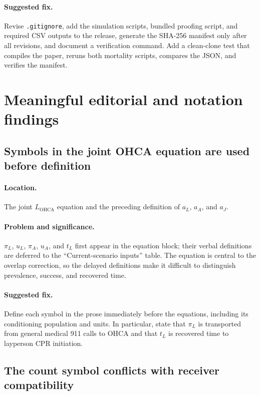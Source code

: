 \documentclass[11pt]{article}
\begin{document}
\paragraph{Suggested fix.}
Revise \texttt{.gitignore}, add the simulation scripts, bundled proofing script,
and required CSV outputs to the release, generate the SHA-256 manifest only
after all revisions, and document a verification command.  Add a clean-clone
test that compiles the paper, reruns both mortality scripts, compares the JSON,
and verifies the manifest.

\section*{Meaningful editorial and notation findings}

\subsection*{Symbols in the joint OHCA equation are used before definition}

\paragraph{Location.}
The joint $L_{\mathrm{OHCA}}$ equation and the preceding definition of $a_L$,
$a_A$, and $a_J$.

\paragraph{Problem and significance.}
$\pi_L$, $u_L$, $\pi_A$, $u_A$, and $t_L$ first appear in the equation block;
their verbal definitions are deferred to the ``Current-scenario inputs'' table.  The
equation is central to the overlap correction, so the delayed definitions make
it difficult to distinguish prevalence, success, and recovered time.

\paragraph{Suggested fix.}
Define each symbol in the prose immediately before the equations, including
its conditioning population and units.  In particular, state that $\pi_L$ is
transported from general medical 911 calls to OHCA and that $t_L$ is recovered
time to layperson CPR initiation.

\subsection*{The count symbol conflicts with receiver compatibility}
\end{document}
